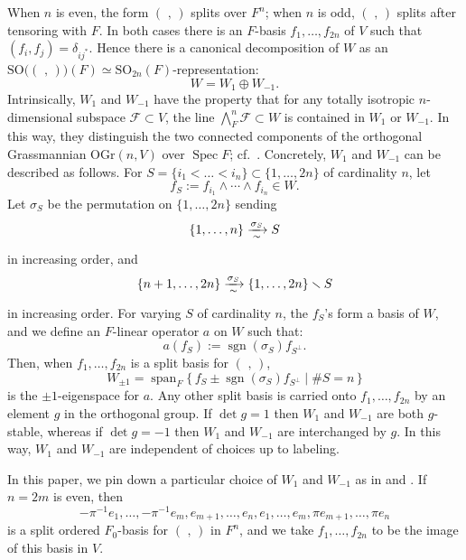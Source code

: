 \documentclass[pdflatex,sn-mathphys-num]{sn-jnl}%
\makeatletter
\theoremstyle{thmstyleone}%
\theoremstyle{thmstyletwo}%
\numberwithin{equation}{subsection}
\theoremstyle{thmstylethree}%
\newcommand{\sF}{\ensuremath{\mathscr{F}}\xspace}
\newcommand{\OGr}{\mathrm{OGr}}
\DeclareMathOperator{\spann}{span}
\DeclareMathOperator{\Spec}{Spec}
\newcommand{\SO}{{\mathrm{SO}}}
\DeclareMathOperator{\sgn}{sgn}
\newcommand{\sform}{\ensuremath{(\text{~,~})}\xspace}
\newlength{\olen}
\newlength{\ulen}
\newlength{\xlen}
\newcommand{\xra}[2][]{%
		\ifbool{@display}%
		{\settowidth{\olen}{$\overset{#2}{\longrightarrow}$}%
			\settowidth{\ulen}{$\underset{#1}{\longrightarrow}$}%
			\settowidth{\xlen}{$\xrightarrow[#1]{#2}$}%
			\ifdimgreater{\olen}{\xlen}%
			{\underset{#1}{\overset{#2}{\longrightarrow}}}%
			{\ifdimgreater{\ulen}{\xlen}%
				{\underset{#1}{\overset{#2}{\longrightarrow}}}
				{\xrightarrow[#1]{#2}}}}%
		{\xrightarrow[#1]{#2}}
	}
\newcommand{\undertilde}{\raisebox{0.4ex}{\smash[t]{$\scriptstyle\sim$}}}
\makeatother
\begin{document}
When $n$ is even, the form \sform splits over $F^n$; when $n$ is odd, \sform splits after tensoring with $F$.
In both cases there is an $F$-basis $f_1,\dotsc,f_{2n}$ of $V$ such that $(f_i,f_j) = \delta_{ij^*}$.  
Hence there is a canonical decomposition of $W$ as an $\SO\bigl(\sform\bigr)(F) \simeq \SO_{2n}(F)$-representation:
\begin{equation*}
	W = W_1 \oplus W_{-1}.
\end{equation*}
Intrinsically, $W_1$ and $W_{-1}$ have the property that for any totally isotropic $n$-dimensional subspace $\sF \subset V$, the line $\bigwedge_F^n\sF \subset W$ is contained in $W_1$ or $W_{-1}$. In this way, they distinguish the two connected components of the orthogonal Grassmannian $\OGr(n, V)$ over $\Spec F$; cf.\ \cite[\S 8.2.1]{PR2009}.
Concretely, $W_1$ and $W_{-1}$ can be described as follows.  
For $S = \{i_1< \dots < i_n\} \subset \{1,\dotsc,2n\}$ of cardinality $n$, let
\begin{equation*}\label{moduli_PR:disp-f-S}
	f_S := f_{i_1} \wedge \dotsb \wedge f_{i_n} \in W.
\end{equation*}
Let $\sigma_S$ be the permutation on $\{1,\dotsc,2n\}$ sending
\begin{equation*}
    \{1,\dotsc,n\} \xra[\undertilde]{\sigma_S} S
\end{equation*} 
in increasing order, and
\begin{equation*}
    \{n+1,\dotsc,2n\} \xra[\undertilde]{\sigma_S} \{1,\dotsc,2n\} \smallsetminus S
\end{equation*}
in increasing order.  For varying $S$ of cardinality $n$, the $f_S$'s form a basis of $W$, and we define an $F$-linear operator $a$ on $W$ such that:
\begin{equation*}
    a(f_S) := \sgn(\sigma_S)f_{S^\perp}.
\end{equation*}
Then, when $f_1,\dotsc,f_{2n}$ is a split basis for \sform,
\begin{equation}\label{moduli_PR:W_+-1}
	W_{\pm 1} = \spann_F\bigl\{\,f_S \pm \sgn(\sigma_S)f_{S^\perp}\mid  \#S=n\,\bigr\}
\end{equation}
is the $\pm 1$-eigenspace for $a$.  Any other split basis is carried onto $f_1,\dotsc,f_{2n}$ by an element $g$ in the orthogonal group.  If $\det g = 1$ then $W_1$ and $W_{-1}$ are both $g$-stable, whereas if $\det g = -1$ then $W_1$ and $W_{-1}$ are interchanged by $g$.  In this way, $W_1$ and $W_{-1}$ are independent of choices up to labeling.
		
		
In this paper, we pin down a particular choice of $W_1$ and $W_{-1}$ as in \cite[\S 7.2]{PR2009} and \cite{Smithling2011, Smithling2014}. 
If $n = 2m$ is even, then
\begin{equation}\label{moduli_PR:even-basis}
	-\pi^{-1}e_1,\dotsc,-\pi^{-1}e_m, e_{m+1},\dotsc,e_n,e_1,\dotsc,e_m, \pi e_{m+1},\dotsc, \pi e_{n}	
\end{equation}
is a split ordered $F_0$-basis for \sform in $F^n$, and we take $f_1,\dotsc,f_{2n}$ to be the image of this basis in $V$.  
		
\end{document}
